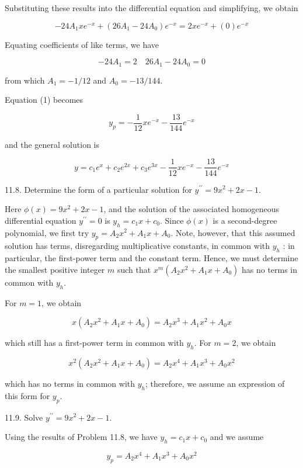 \documentclass[10pt]{article}
\begin{document}
Substituting these results into the differential equation and simplifying, we obtain

$$
-24 A_{1} x e^{-x}+\left(26 A_{1}-24 A_{0}\right) e^{-x}=2 x e^{-x}+(0) e^{-x}
$$

Equating coefficients of like terms, we have

$$
-24 A_{1}=2 \quad 26 A_{1}-24 A_{0}=0
$$

from which $A_{1}=-1 / 12$ and $A_{0}=-13 / 144$.

Equation (1) becomes

$$
y_{p}=-\frac{1}{12} x e^{-x}-\frac{13}{144} e^{-x}
$$

and the general solution is

$$
y=c_{1} e^{x}+c_{2} e^{2 x}+c_{3} e^{3 x}-\frac{1}{12} x e^{-x}-\frac{13}{144} e^{-x}
$$

11.8. Determine the form of a particular solution for $y^{\prime \prime}=9 x^{2}+2 x-1$.

Here $\phi(x)=9 x^{2}+2 x-1$, and the solution of the associated homogeneous differential equation $y^{\prime \prime}=0$ is $y_{h}=c_{1} x+c_{0}$. Since $\phi(x)$ is a second-degree polynomial, we first try $y_{p}=A_{2} x^{2}+A_{1} x+A_{0}$. Note, however, that this assumed solution has terms, disregarding multiplicative constants, in common with $y_{h}$ : in particular, the first-power term and the constant term. Hence, we must determine the smallest positive integer $m$ such that $x^{m}\left(A_{2} x^{2}+A_{1} x+A_{0}\right)$ has no terms in common with $y_{h}$.

For $m=1$, we obtain

$$
x\left(A_{2} x^{2}+A_{1} x+A_{0}\right)=A_{2} x^{3}+A_{1} x^{2}+A_{0} x
$$

which still has a first-power term in common with $y_{h}$. For $m=2$, we obtain

$$
x^{2}\left(A_{2} x^{2}+A_{1} x+A_{0}\right)=A_{2} x^{4}+A_{1} x^{3}+A_{0} x^{2}
$$

which has no terms in common with $y_{h}$; therefore, we assume an expression of this form for $y_{p}$.

11.9. Solve $y^{\prime \prime}=9 x^{2}+2 x-1$.

Using the results of Problem 11.8, we have $y_{h}=c_{1} x+c_{0}$ and we assume


\begin{equation*}
y_{p}=A_{2} x^{4}+A_{1} x^{3}+A_{0} x^{2} \tag{1}
\end{equation*}
\end{document}
